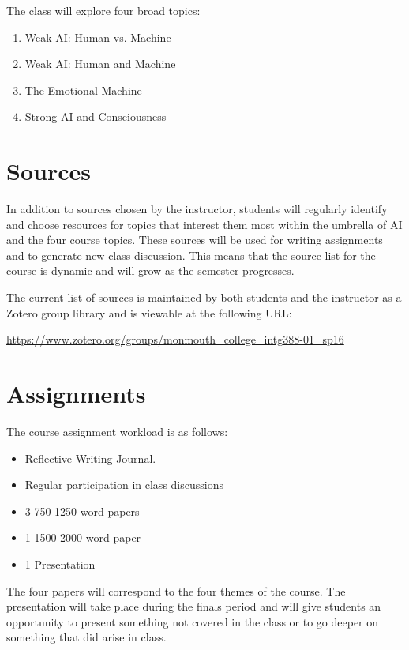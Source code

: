 \documentclass[nobib]{tufte-handout}
\begin{document}
The class will explore four broad topics:
\begin{enumerate}
\item Weak AI: Human vs. Machine
\item Weak AI: Human and Machine
\item The Emotional Machine
\item Strong AI and Consciousness
\end{enumerate}

\section{Sources}

In addition to sources chosen by the instructor, students will regularly identify and choose resources for topics that interest them most within the umbrella of AI and the four course topics. These sources will be used for writing assignments and to generate new class discussion.  This means that the source list for the course is dynamic and will grow as the semester progresses. 

The current list of sources is maintained by both students and the instructor as a Zotero group library and is viewable at the following URL:
\vspace{.2in}

\begin{footnotesize}
\url{https://www.zotero.org/groups/monmouth_college_intg388-01_sp16}
\end{footnotesize}

 
\section{Assignments}

The course assignment workload is as follows:
\begin{itemize}
\item Reflective Writing Journal. 
\item Regular participation in class discussions
\item 3 750-1250 word papers
\item 1 1500-2000 word paper
\item 1 Presentation 
\end{itemize}
The four papers will correspond to the four themes of the course. The presentation will take place during the finals period and will give students an opportunity to present something not covered in the class or to go deeper on something that did arise in class.
\end{document}
